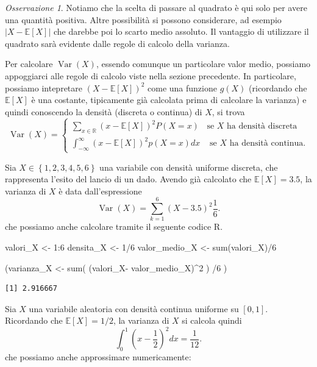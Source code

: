 \documentclass[
  italian,
  letterpaper,
]{book}
\newenvironment{Shaded}{\begin{snugshade}}{\end{snugshade}}
\newcommand{\DecValTok}[1]{\textcolor[rgb]{0.68,0.00,0.00}{#1}}
\newcommand{\FunctionTok}[1]{\textcolor[rgb]{0.28,0.35,0.67}{#1}}
\newcommand{\NormalTok}[1]{\textcolor[rgb]{0.00,0.23,0.31}{#1}}
\newcommand{\OtherTok}[1]{\textcolor[rgb]{0.00,0.23,0.31}{#1}}
\newcommand{\SpecialCharTok}[1]{\textcolor[rgb]{0.37,0.37,0.37}{#1}}
\newcommand{\bra}[1]{\left( #1 \right)}
\newcommand{\sqa}[1]{\left[ #1 \right]}
\newcommand{\cur}[1]{\left\{ #1 \right\}}
\newcommand{\R}{\mathbb{R}}
\newcommand{\E}[1]{\mathbb{E}\sqa{#1}}
\newcommand{\Var}[1]{\operatorname{Var}\bra{#1}}
\theoremstyle{definition}
\theoremstyle{remark}
\newtheorem*{remark}{Osservazione}
\begin{document}
\begin{remark}
Notiamo che la scelta di passare al quadrato è qui solo per avere una
quantità positiva. Altre possibilità si possono considerare, ad esempio
\(|X-\E{X}|\) che darebbe poi lo scarto medio assoluto. Il vantaggio di
utilizzare il quadrato sarà evidente dalle regole di calcolo della
varianza.
\end{remark}

Per calcolare \(\Var{X}\), essendo comunque un particolare valor medio,
possiamo appoggiarci alle regole di calcolo viste nella sezione
precedente. In particolare, possiamo intepretare \((X-\E{X})^2\) come
una funzione \(g(X)\) (ricordando che \(\E{X}\) è una costante,
tipicamente già calcolata prima di calcolare la varianza) e quindi
conoscendo la densità (discreta o continua) di \(X\), si trova
\[ \Var{X} = \begin{cases} \sum_{x \in \R} (x-\E{X})^2 P(X=x) & \text{se $X$ ha densità discreta}\\ 
 \int_{-\infty}^\infty (x- \E{X})^2 p(X=x) d x & \text{ se $X$ ha densità continua.}\end{cases}\]

Sia \(X \in \cur{1,2,3,4,5,6}\) una variabile con densità uniforme
discreta, che rappresenta l'esito del lancio di un dado. Avendo già
calcolato che \(\E{X}= 3.5\), la varianza di \(X\) è data
dall'espressione \[ \Var{X} = \sum_{k=1}^6  (X-3.5)^2 \frac{1}6.\] che
possiamo anche calcolare tramite il seguente codice R.

\begin{Shaded}
\begin{Highlighting}[]
\NormalTok{valori\_X }\OtherTok{\textless{}{-}} \DecValTok{1}\SpecialCharTok{:}\DecValTok{6}
\NormalTok{densita\_X }\OtherTok{\textless{}{-}} \DecValTok{1}\SpecialCharTok{/}\DecValTok{6} 
\NormalTok{valor\_medio\_X  }\OtherTok{\textless{}{-}} \FunctionTok{sum}\NormalTok{(valori\_X)}\SpecialCharTok{/}\DecValTok{6}

\NormalTok{(varianza\_X }\OtherTok{\textless{}{-}} \FunctionTok{sum}\NormalTok{( (valori\_X}\SpecialCharTok{{-}}\NormalTok{ valor\_medio\_X)}\SpecialCharTok{\^{}}\DecValTok{2}\NormalTok{ ) }\SpecialCharTok{/}\DecValTok{6}\NormalTok{ )}
\end{Highlighting}
\end{Shaded}

\begin{verbatim}
[1] 2.916667
\end{verbatim}

Sia \(X\) una variabile aleatoria con densità continua uniforme su
\([0,1]\). Ricordando che \(\E{X}=1/2\), la varianza di \(X\) si calcola
quindi \[ \int_0^1 \bra{ x- \frac 12 }^2 dx = \frac 1 {12}.\] che
possiamo anche approssimare numericamente:
\end{document}
